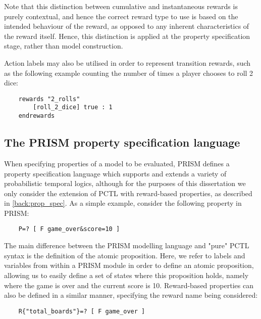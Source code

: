 Note that this distinction between cumulative and instantaneous rewards is purely contextual, and hence the correct reward type to use is based on the intended behaviour of the reward, as opposed to any inherent characteristics of the reward itself. Hence, this distinction is applied at the property specification stage, rather than model construction.

Action labels may also be utilised in order to represent transition rewards, such as the following example counting the number of times a player chooses to roll 2 dice:

\begin{verbatim}
    rewards "2_rolls"
        [roll_2_dice] true : 1
    endrewards
\end{verbatim}




\subsection{The PRISM property specification language}
\label{back:PRISM-prop}

When specifying properties of a model to be evaluated, PRISM defines a property specification language which supports and extends a variety of probabilistic temporal logics, although for the purposes of this dissertation we only consider the extension of PCTL with reward-based properties, as described in \ref{back:prop_spec}. As a simple example, consider the following property in PRISM:

\begin{verbatim}
    P=? [ F game_over&score=10 ]
\end{verbatim}

The main difference between the PRISM modelling language and "pure" PCTL syntax is the definition of the atomic proposition. Here, we refer to labels and variables from within a PRISM module in order to define an atomic proposition, allowing us to easily define a set of states where this proposition holds, namely where the game is over and the current score is 10. Reward-based properties can also be defined in a similar manner, specifying the reward name being considered:

\begin{verbatim}
    R{"total_boards"}=? [ F game_over ]
\end{verbatim}



